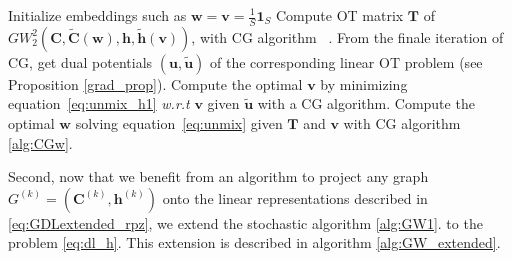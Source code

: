 \documentclass{article}
\def\eqref#1{equation~\ref{#1}}
\def\vh{{\bm{h}}}
\def\vu{{\bm{u}}}
\def\vv{{\bm{v}}}
\def\vw{{\bm{w}}}
\def\mC{{\bm{C}}}
\def\mT{{\bm{T}}}
\begin{document}
	\begin{algorithm}[H]
		\caption{BCD for extended GW unmixing problem inherent to \eqref{eq:dl_h}}
		\label{alg:BCD_extended}
		\begin{algorithmic}[1]
			\STATE Initialize embeddings such as $\vw=\vv= \frac{1}{S}\mathbf{1}_S$
			\REPEAT
			\STATE Compute OT matrix $\mT$ of $GW_2^2\left(\mC, \widetilde{\mC}(\vw),\vh,\widetilde{\vh}(\vv) \right)$, with CG algorithm ~\citep[Alg.1 \& 2]{vayer-fused-2018}.  From the finale iteration of CG, get dual potentials $(\vu, \widetilde{\vu})$ of the corresponding linear OT problem (see Proposition \ref{grad_prop}).
			\STATE Compute the optimal $\vv$ by minimizing \eqref{eq:unmix_h1} \emph{w.r.t} $\vv$ given $\widetilde{\vu}$ with a CG algorithm. 
			\STATE Compute the optimal $\vw$ solving \eqref{eq:unmix} given 
			$\mT$ and $\vv$ with CG algorithm \ref{alg:CGw}. 
		\end{algorithmic}
	\end{algorithm}
	
	Second, now that we benefit from an algorithm to project any graph $G^{(k)} = (\mC^{(k)},\vh^{(k)})$ onto the linear representations described in \ref{eq:GDLextended_rpz}, we extend the stochastic algorithm \ref{alg:GW1}. to the problem \ref{eq:dl_h}. This extension is described in algorithm \ref{alg:GW_extended}. 
	
\end{document}
